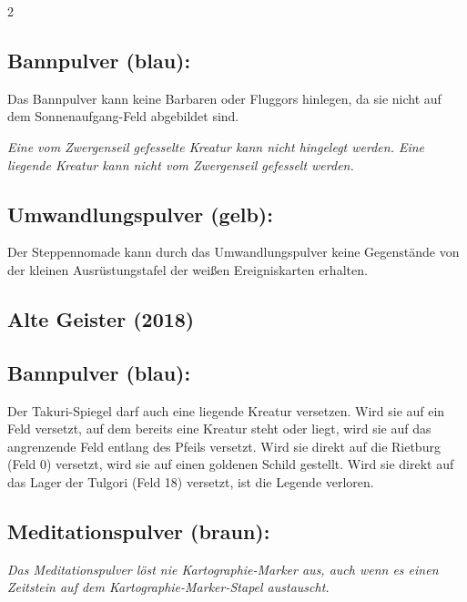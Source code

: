 \documentclass[10pt, a4paper, oneside]{book}
\newcommand{\fan}[1]{\textit{#1}}
\begin{document}
\begin{multicols*}{2}
\begin{bgcolor}[color-BB]
\subsection{Bannpulver (blau):}

Das Bannpulver kann keine Barbaren oder Fluggors hinlegen, da sie nicht auf dem Sonnenaufgang-Feld abgebildet sind.
\supercite{90058}

\fan{Eine vom Zwergenseil gefesselte Kreatur kann nicht hingelegt werden. Eine liegende Kreatur kann nicht vom Zwergenseil gefesselt werden.}


\subsection{Umwandlungspulver (gelb):}

Der Steppennomade kann durch das Umwandlungspulver keine Gegenstände von der kleinen Ausrüstungstafel der weißen Ereigniskarten erhalten.
\supercite{88659}

\end{bgcolor}



\begin{bgcolor}[color-AG]
\section{Alte Geister (2018)}




\subsection{Bannpulver (blau):}

Der Takuri-Spiegel darf auch eine liegende Kreatur versetzen. Wird sie auf ein Feld versetzt, auf dem bereits eine Kreatur steht oder liegt, wird sie auf das angrenzende Feld entlang des Pfeils versetzt. Wird sie direkt auf die Rietburg (Feld 0) versetzt, wird sie auf einen goldenen Schild gestellt. Wird sie direkt auf das Lager der Tulgori (Feld 18) versetzt, ist die Legende verloren.
\supercite{AG:Begleitheft}



\subsection{Meditationspulver (braun):}

\fan{Das Meditationspulver löst nie Kartographie-Marker aus, auch wenn es einen Zeitstein auf dem Kartographie-Marker-Stapel austauscht.}



\end{bgcolor}
\end{multicols*}
\end{document}
